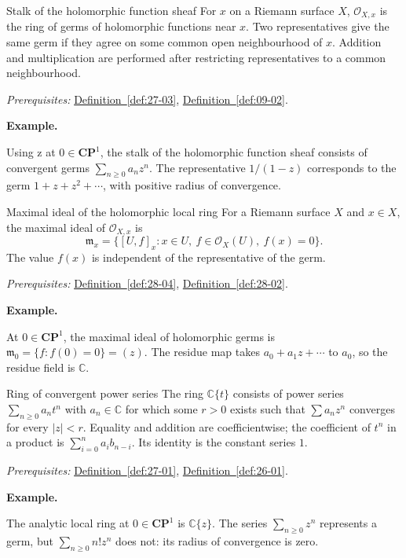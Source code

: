 \documentclass[11pt]{article}
\makeatletter
\newcommand{\C}{\mathbb C}
\newcounter{definition}
\newcommand{\CP}{\mathbf{CP}}
\newcommand{\exampleheading}{\par\medskip\textbf{Example.}\par\smallskip}
\newcommand{\currentdefinition}[1]{\protected@edef\@currentlabel{#1}}
\makeatother
\begin{document}
\begin{definitionbox}{Stalk of the holomorphic function sheaf}
\currentdefinition{\thedefinition}
\label{def:28-04}
For $x$ on a Riemann surface $X$, $\mathcal O_{X,x}$ is the ring of germs of holomorphic functions near $x$. Two representatives give the same germ if they agree on some common open neighbourhood of $x$. Addition and multiplication are performed after restricting representatives to a common neighbourhood.

\smallskip
\textit{Prerequisites:} \hyperref[def:27-03]{Definition~\ref*{def:27-03}}, \hyperref[def:09-02]{Definition~\ref*{def:09-02}}.

\exampleheading
Using z at $0\in\CP^1$, the stalk of the holomorphic function sheaf consists of convergent germs $\sum_{n\ge0}a_nz^n$. The representative $1/(1-z)$ corresponds to the germ $1+z+z^2+\cdots$, with positive radius of convergence.
\end{definitionbox}

\begin{definitionbox}{Maximal ideal of the holomorphic local ring}
\currentdefinition{\thedefinition}
\label{def:28-05}
For a Riemann surface $X$ and $x\in X$, the maximal ideal of $\mathcal O_{X,x}$ is
\[\mathfrak m_x=\{[U,f]_x:x\in U,\ f\in\mathcal O_X(U),\ f(x)=0\}.\]
The value $f(x)$ is independent of the representative of the germ.

\smallskip
\textit{Prerequisites:} \hyperref[def:28-04]{Definition~\ref*{def:28-04}}, \hyperref[def:28-02]{Definition~\ref*{def:28-02}}.

\exampleheading
At $0\in\CP^1$, the maximal ideal of holomorphic germs is $\mathfrak m_0=\{f:f(0)=0\}=(z)$. The residue map takes $a_0+a_1z+\cdots$ to $a_0$, so the residue field is $\C$.
\end{definitionbox}

\begin{definitionbox}{Ring of convergent power series}
\currentdefinition{\thedefinition}
\label{def:28-06}
The ring $\C\{t\}$ consists of power series $\sum_{n\ge0}a_nt^n$ with $a_n\in\C$ for which some $r>0$ exists such that $\sum a_nz^n$ converges for every $|z|<r$. Equality and addition are coefficientwise; the coefficient of $t^n$ in a product is $\sum_{i=0}^n a_i b_{n-i}$. Its identity is the constant series $1$.

\smallskip
\textit{Prerequisites:} \hyperref[def:27-01]{Definition~\ref*{def:27-01}}, \hyperref[def:26-01]{Definition~\ref*{def:26-01}}.

\exampleheading
The analytic local ring at $0\in\CP^1$ is $\C\{z\}$. The series $\sum_{n\ge0}z^n$ represents a germ, but $\sum_{n\ge0}n!z^n$ does not: its radius of convergence is zero.
\end{definitionbox}
\end{document}
